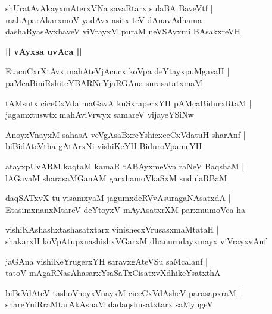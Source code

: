 \documentclass[twoside,12pt,openright]{book}
\newcounter{shloka}[chapter]
\def\uvaca#1{\centerline{{\large\textbf{#1}}}}
\begin{document}
\begin{shloka}%
shUratAvAkayxmAterxVNa savaRtarx sulaBA BaveVtf |\\
mahAparAkarxmoV yadAvx asitx teV dAnavAdhama \\
dashaRyasAvxhaveV viVrayxM puraM neVSAyxmi BAsakxreVH 
\end{shloka}

\uvaca{|| vAyxsa uvAca ||}

\begin{shloka}%
EtacuCxrXtAvx mahAteVjAcucx koVpa deYtayxpuMgavaH |\\
paMcaBiniRshiteYBARNeYjaRGAna surasatatxmaM 
\end{shloka}

\begin{shloka}%
tAMsutx ciceCxVda maGavA kuSxraperxYH pAMcaBidurxRtaM |\\
jagamxtuswtx mahAviVrwyx samareV vijayeYSiNw 
\end{shloka}

\begin{shloka}%
AnoyxVnayxM sahasA veVgAsaBxreYshicxceCxVdatuH sharAnf |\\
biBidAteVtha gAtArxNi vishiKeYH BiduroVpameYH
\end{shloka}

\begin{shloka}%
atayxpUvARM kaqtaM kamaR tABAyxmeVva raNeV BaqshaM |\\
lAGavaM sharasaMGanAM garxhamoVkaSxM sudulaRBaM 
\end{shloka}

\begin{shloka}%
daqSATxvX tu visamxyaM jagumxdeRVvAsuragaNAsatxdA |\\
EtasimxnanxMtareV deYtoyxV mAyAsatxrXM parxmumoVca ha
\end{shloka}

\begin{shloka}%
vishiKAshashxtashasatxtarx vinishecxVrusasxmaMtataH |\\
shakarxH koVpAtupxnashishxVGarxM dhanurudayxmayx viVrayxvAnf 
\end{shloka}

\begin{shloka}%
jaGAna vishiKeYrugerxYH saravxgAteVSu saMcalanf |\\
tatoV mAgaRNasAhasarxYsaSaTxCisatxvXdhikeYsatxthA 
\end{shloka}

\begin{shloka}%
biBeVdAteV tashoVnoyxVnayxM ciceCxVdAsheV parasapxraM |\\
shareYniRraMtarAkAshaM dadaqshusatxtarx saMyugeV 
\end{shloka}
\end{document}

